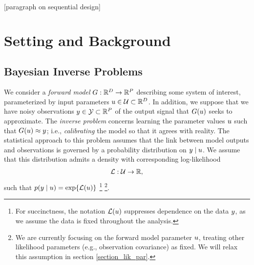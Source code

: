 \documentclass[12pt]{article}
\begin{document}
[paragraph on sequential design]

\section{Setting and Background}

\subsection{Bayesian Inverse Problems}
We consider a \textit{forward model} $G: \mathbb{R}^{D} \to \mathbb{R}^{P}$ describing some system of interest, parameterized by 
input parameters $u \in \mathcal{U} \subset \mathbb{R}^{D}$. In addition, we suppose that we have noisy observations 
$y \in \mathcal{Y} \subset \mathbb{R}^{P}$ of the output signal that $G(u)$ seeks to approximate. The 
\textit{inverse problem} concerns learning the parameter values $u$ such that $G(u) \approx y$; i.e., \textit{calibrating}
the model so that it agrees with reality. The statistical approach to this problem assumes that the link between model outputs and 
observations is governed by a probability distribution on  $y \mid u$. We assume that this distribution admits a density 
with corresponding log-likelihood 
\begin{align}
\mathcal{L}: \mathcal{U} \to \mathbb{R}, \label{log_likelihood}
\end{align}
such that $p(y \mid u) = \exp\mathopen{}\left\{\mathcal{L}(u)\right\}\mathclose{}$ 
\footnote{For succinctness, the notation $\mathcal{L}(u)$ suppresses dependence on the data $y$, 
as we assume the data is fixed throughout the analysis.}
\footnote{We are currently focusing on the forward model parameter $u$, treating other likelihood 
parameters (e.g., observation covariance) as fixed. We will relax this assumption 
in section \ref{section_lik_par}.}.
\end{document}
